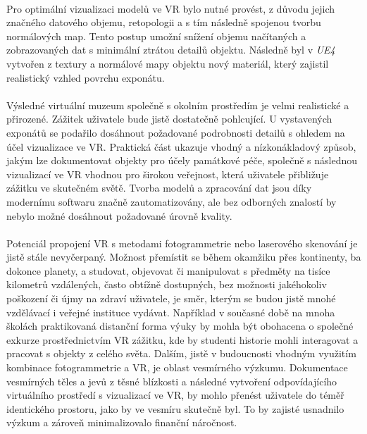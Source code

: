 \documentclass[a4paper, 12pt]{report}
\begin{document}
\\
Pro optimální vizualizaci modelů ve VR bylo nutné provést, z důvodu jejich značného datového objemu, retopologii a s tím následně spojenou tvorbu normálových map. Tento postup umožní snížení objemu načítaných a zobrazovaných dat s minimální ztrátou detailů objektu. Následně byl v \textit{UE4} vytvořen z textury a normálové mapy objektu nový materiál, který zajistil realistický vzhled povrchu exponátu.\\
\\
Výsledné virtuální muzeum společně s okolním prostředím je velmi realistické a přirozené. Zážitek uživatele bude jistě dostatečně pohlcující. U vystavených exponátů se podařilo dosáhnout požadované podrobnosti detailů s ohledem na účel vizualizace ve VR. Praktická část ukazuje vhodný a nízkonákladový způsob, jakým lze dokumentovat objekty pro účely památkové péče, společně s následnou vizualizací ve VR vhodnou pro širokou veřejnost, která uživatele přibližuje zážitku ve skutečném světě. Tvorba modelů a zpracování dat jsou díky modernímu softwaru značně zautomatizovány, ale bez odborných znalostí by nebylo možné dosáhnout požadované úrovně kvality. \\
\\
Potenciál propojení VR s metodami fotogrammetrie nebo laserového skenování je jistě stále nevyčerpaný. Možnost přemístit se během okamžiku přes kontinenty, ba dokonce planety, a studovat, objevovat či manipulovat s předměty na tisíce kilometrů vzdálených, často obtížně dostupných, bez možnosti jakéhokoliv poškození či újmy na zdraví uživatele, je směr, kterým se budou jistě mnohé vzdělávací i veřejné instituce vydávat. Například v současné době na mnoha školách praktikovaná distanční forma výuky by mohla být obohacena o společné exkurze prostřednictvím VR zážitku, kde by studenti historie mohli interagovat a pracovat s objekty z celého světa. Dalším, jistě v budoucnosti vhodným využitím kombinace fotogrammetrie a VR, je oblast vesmírného výzkumu. Dokumentace vesmírných těles a jevů z těsné blízkosti a následné vytvoření odpovídajícího virtuálního prostředí s vizualizací ve VR, by mohlo přenést uživatele do téměř identického prostoru, jako by ve vesmíru skutečně byl. To by zajisté usnadnilo výzkum a zároveň minimalizovalo finanční náročnost. 
\end{document}
